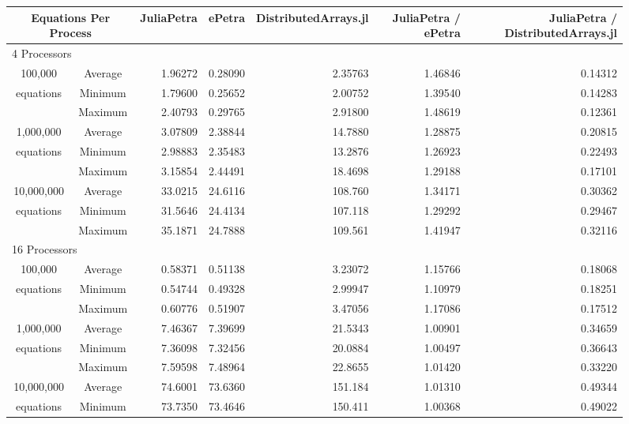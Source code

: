 \documentclass[acmsmall]{acmart}
\begin{document}
\begin{figure}[h]
\begin{tabular}{|c c|r|r|r||r|r|}
	\hline
		\multicolumn{2}{|c|}{Equations Per Process}
		& JuliaPetra
		& ePetra
		& \multicolumn{1}{m{1.8cm}||}{Distributed\-Arrays.jl}
		& \multicolumn{1}{m{1.75cm}|}{JuliaPetra / ePetra}
		& \multicolumn{1}{m{1.8cm}|}{JuliaPetra / Distributed\-Arrays.jl} \\
	\hline
		\multicolumn{7}{|l|}{4 Processors}\\
	\hline
		100,000			&Average & 1.96272 & 0.28090 & 2.35763 & 1.46846 & 0.14312 \\
		equations		&Minimum & 1.79600 & 0.25652 & 2.00752 & 1.39540 & 0.14283 \\
						&Maximum & 2.40793 & 0.29765 & 2.91800 & 1.48619 & 0.12361 \\
	\hline
		1,000,000		&Average & 3.07809 & 2.38844 & 14.7880 & 1.28875 & 0.20815 \\
		equations		&Minimum & 2.98883 & 2.35483 & 13.2876 & 1.26923 & 0.22493 \\
						&Maximum & 3.15854 & 2.44491 & 18.4698 & 1.29188 & 0.17101 \\
	\hline
		10,000,000		&Average & 33.0215 & 24.6116 & 108.760 & 1.34171 & 0.30362 \\
		equations		&Minimum & 31.5646 & 24.4134 & 107.118 & 1.29292 & 0.29467 \\
						&Maximum & 35.1871 & 24.7888 & 109.561 & 1.41947 & 0.32116 \\
	\hline
		\multicolumn{7}{|l|}{16 Processors}\\
	\hline
		100,000			&Average & 0.58371 & 0.51138 & 3.23072 & 1.15766 & 0.18068 \\
		equations		&Minimum & 0.54744 & 0.49328 & 2.99947 & 1.10979 & 0.18251 \\
						&Maximum & 0.60776 & 0.51907 & 3.47056 & 1.17086 & 0.17512 \\
	\hline
		1,000,000		&Average & 7.46367 & 7.39699 & 21.5343 & 1.00901 & 0.34659 \\
		equations		&Minimum & 7.36098 & 7.32456 & 20.0884 & 1.00497 & 0.36643 \\
						&Maximum & 7.59598 & 7.48964 & 22.8655 & 1.01420 & 0.33220 \\
	\hline
		10,000,000		&Average & 74.6001 & 73.6360 & 151.184 & 1.01310 & 0.49344 \\
		equations		&Minimum & 73.7350 & 73.4646 & 150.411 & 1.00368 & 0.49022 \\

\end{tabular}
\end{figure}
\end{document}
